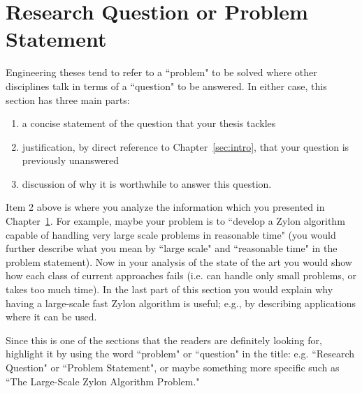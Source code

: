 \chapter{Research Question or Problem Statement} 
\label{sec:ResearchQ}

Engineering theses tend to refer to a ``problem" to be solved where other
disciplines talk in terms of a ``question" to be answered. In either case,
this section has three main parts:

\label{sec:Steps}
\begin{enumerate}
\item a concise statement of the question that your thesis tackles
\item justification, by direct reference to Chapter~\ref{sec:intro}, that your question is previously unanswered
\item discussion of why it is worthwhile to answer this question.
\end{enumerate}

Item 2 above is where you analyze the information which you presented in
Chapter~\ref{sec:ResearchQ}. For example, maybe your problem is to ``develop a Zylon algorithm capable of handling very large scale problems in reasonable
time" (you would further describe what you mean by ``large scale" and
``reasonable time" in the problem statement). Now in your analysis of the
state of the art you would show how each class of current approaches fails
(i.e. can handle only small problems, or takes too much time). In the last
part of this section you would explain why having a large-scale fast Zylon
algorithm is useful; e.g., by describing applications where it can be
used.

Since this is one of the sections that the readers are definitely looking
for, highlight it by using the word ``problem" or ``question" in the title:
e.g. ``Research Question" or ``Problem Statement", or maybe something more
specific such as ``The Large-Scale Zylon Algorithm Problem."

